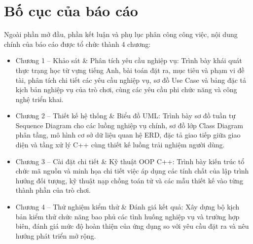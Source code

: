 \section{Bố cục của báo cáo}
\label{sec:structure}
Ngoài phần mở đầu, phần kết luận và phụ lục phân công công việc, nội dung chính của báo cáo được tổ chức thành 4 chương:
\begin{itemize}
    \item Chương 1 -- Khảo sát \& Phân tích yêu cầu nghiệp vụ: Trình bày khái quát thực trạng học từ vựng tiếng Anh, bài toán đặt ra, mục tiêu và phạm vi đề tài, phân tích chi tiết các yêu cầu nghiệp vụ, sơ đồ Use Case và bảng đặc tả kịch bản nghiệp vụ của trò chơi, cùng các yêu cầu phi chức năng và công nghệ triển khai.
    \item Chương 2 -- Thiết kế hệ thống \& Biểu đồ UML: Trình bày sơ đồ tuần tự Sequence Diagram cho các luồng nghiệp vụ chính, sơ đồ lớp Class Diagram phân tầng, mô hình cơ sở dữ liệu quan hệ ERD, đặc tả giao tiếp giữa giao diện và tầng xử lý C++ cùng thiết kế luồng trải nghiệm người dùng.
    \item Chương 3 -- Cài đặt chi tiết \& Kỹ thuật OOP C++: Trình bày kiến trúc tổ chức mã nguồn và minh họa chi tiết việc áp dụng các tính chất của lập trình hướng đối tượng, kỹ thuật nạp chồng toán tử và các mẫu thiết kế vào từng thành phần của trò chơi.
    \item Chương 4 -- Thử nghiệm kiểm thử \& Đánh giá kết quả: Xây dựng bộ kịch bản kiểm thử chức năng bao phủ các tình huống nghiệp vụ và trường hợp biên, đánh giá mức độ hoàn thiện của ứng dụng so với yêu cầu đặt ra và nêu hướng phát triển mở rộng.
\end{itemize}
